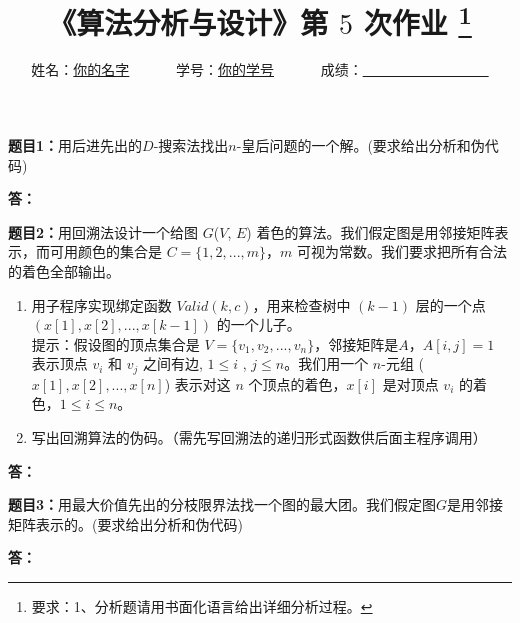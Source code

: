 \documentclass[12pt,a4paper]{article}
\begin{document}
\title{
  {\heiti《算法分析与设计》第 $5$ 次作业
    \footnote{要求：1、分析题请用书面化语言给出详细分析过程。}
    }
}
\date{}

\author{
姓名：\underline{你的名字}~~~~~~
学号：\underline{你的学号}~~~~~~
成绩：\underline{~~~~~~~~~~~~~~~~~~}
}

\maketitle

\noindent
\section*{\bf \color{red}{算法分析题}}
\vspace{10pt}

\noindent
{\bf 题目1：}用后进先出的$D$-搜索法找出$n$-皇后问题的一个解。(要求给出分析和伪代码)

\vspace{5pt}
\noindent
{\bf 答：}

\vspace{10pt}
\noindent
{\bf 题目2：}用回溯法设计一个给图 $G$($V$, $E$) 着色的算法。我们假定图是用邻接矩阵表示，而可用颜色的集合是 $C = \{1, 2, ..., m\}$，$m$ 可视为常数。我们要求把所有合法的着色全部输出。
\begin{enumerate}
	\item[(a)]  用子程序实现绑定函数 $Valid(k, c)$，用来检查树中 $(k-1)$ 层的一个点  $(x[1], x[2], ..., x[k-1])$ 的一个儿子。\\
	提示：假设图的顶点集合是 $V = \{v_1, v_2, ..., v_n\}$，邻接矩阵是$A$，$A[i, j] = 1$ 表示顶点 $v_i$ 和 $v_j$ 之间有边, $1 \leq i$ ,  $j \leq n$。我们用一个 $n$-元组 ($x[1], x[2], ..., x[n]$) 表示对这 $n$ 个顶点的着色，$x[i]$ 是对顶点 $v_i$ 的着色，$1 \leq i \leq n$。
	\item[(b)]  写出回溯算法的伪码。（需先写回溯法的递归形式函数供后面主程序调用）
\end{enumerate}

\vspace{5pt}
\noindent
{\bf 答：}

\vspace{10pt}
\noindent
{\bf 题目3：}用最大价值先出的分枝限界法找一个图的最大团。我们假定图$G$是用邻接矩阵表示的。(要求给出分析和伪代码)

\vspace{5pt}
\noindent
{\bf 答：}
\end{document}
